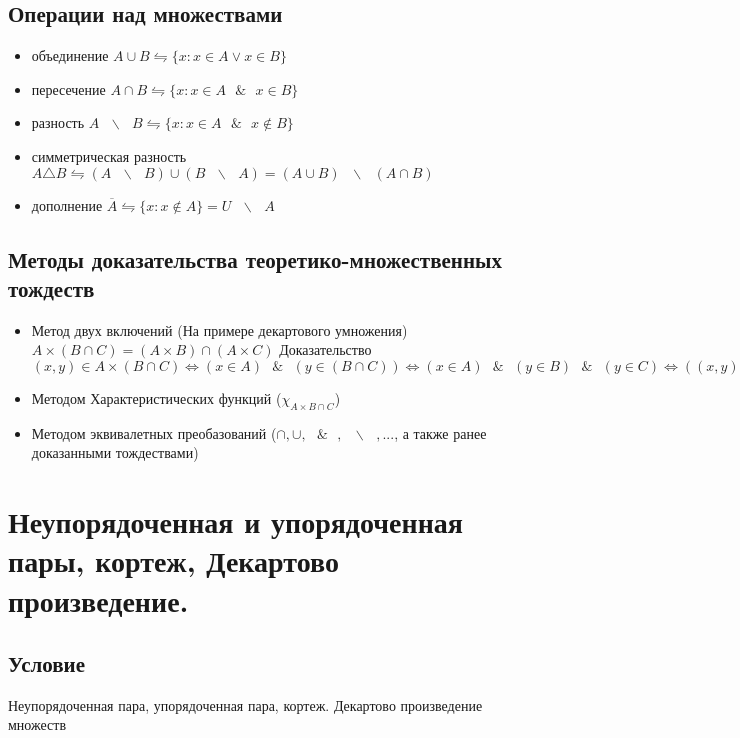 \documentclass{report}
\newcommand{\bslash}{\mbox{ } \backslash \mbox{ }}
\newcommand{\band}{\mbox{ } \& \mbox{ }}
\begin{document}
\subsection{Операции над множествами}
\begin{itemize}
	\item объединение $A \cup B \leftrightharpoons \{x: x \in A \lor x \in B\}$
	\item
	      пересечение $A \cap B \leftrightharpoons \{x: x \in A \band x \in B\}$
	\item
	      разность
	      $ A \bslash B \leftrightharpoons \{x:x \in A \band x \notin B\}$
	\item
	      симметрическая разность
	      $A \triangle B \leftrightharpoons (A \bslash B) \cup (B \bslash A) = (A \cup B) \bslash (A \cap B)$
	\item
	      дополнение
	      $ \overline{A} \leftrightharpoons \{x: x \notin A\} = U \bslash A$
\end{itemize}

\subsection{Методы доказательства теоретико-множественных тождеств}


\begin{itemize}
	\item Метод двух включений (На примере декартового умножения)\newline
	      $A \times (B \cap C) = (A \times B) \cap (A \times C)$\newline
	      Доказательство\newline
	      $(x,y) \in A \times (B \cap C) \Leftrightarrow (x \in A) \band (y \in (B \cap C)) \Leftrightarrow (x \in A) \band (y \in B) \band (y \in C) \Leftrightarrow ((x,y) \in A \times B) \band ((x,y) \in A \times C) \Leftrightarrow (x,y) \in (A \times B) \cap (A \times C)$
	\item Методом Характеристических функций ($\chi_{A \times {B \cap C}}$)
	\item Методом эквивалетных преобазований ($\cap, \cup, \band, \bslash, ...$, а также
		ранее доказанными тождествами)
\end{itemize}
\newpage

\section{Неупорядоченная и упорядоченная пары, кортеж, Декартово произведение.}
\subsection{Условие}
Неупорядоченная пара, упорядоченная пара, кортеж. Декартово произведение множеств
\end{document}
